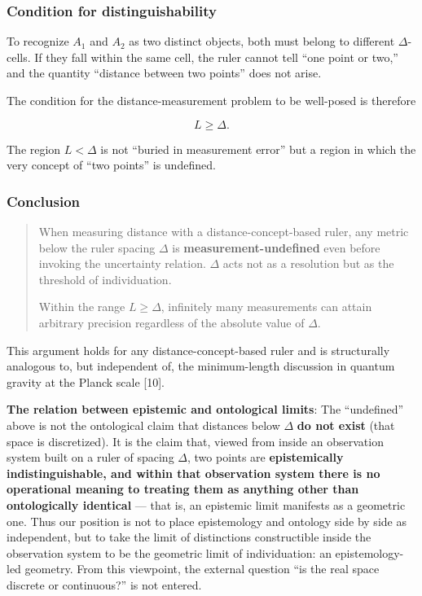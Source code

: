 \documentclass[
]{article}
\begin{document}
\subsubsection{Condition for
distinguishability}\label{condition-for-distinguishability}

To recognize \(A_1\) and \(A_2\) as two distinct objects, both must
belong to different \(\Delta\)-cells. If they fall within the same cell,
the ruler cannot tell ``one point or two,'' and the quantity ``distance
between two points'' does not arise.

The condition for the distance-measurement problem to be well-posed is
therefore

\[L \geq \Delta.\]

The region \(L < \Delta\) is not ``buried in measurement error'' but a
region in which the very concept of ``two points'' is undefined.

\subsubsection{Conclusion}\label{conclusion}

\begin{quote}
When measuring distance with a distance-concept-based ruler, any metric
below the ruler spacing \(\Delta\) is \textbf{measurement-undefined}
even before invoking the uncertainty relation. \(\Delta\) acts not as a
resolution but as the threshold of individuation.

Within the range \(L \geq \Delta\), infinitely many measurements can
attain arbitrary precision regardless of the absolute value of
\(\Delta\).
\end{quote}

This argument holds for any distance-concept-based ruler and is
structurally analogous to, but independent of, the minimum-length
discussion in quantum gravity at the Planck scale {[}10{]}.

\textbf{The relation between epistemic and ontological limits}: The
``undefined'' above is not the ontological claim that distances below
\(\Delta\) \textbf{do not exist} (that space is discretized). It is the
claim that, viewed from inside an observation system built on a ruler of
spacing \(\Delta\), two points are \textbf{epistemically
indistinguishable, and within that observation system there is no
operational meaning to treating them as anything other than
ontologically identical} --- that is, an epistemic limit manifests as a
geometric one. Thus our position is not to place epistemology and
ontology side by side as independent, but to take the limit of
distinctions constructible inside the observation system to be the
geometric limit of individuation: an epistemology-led geometry. From
this viewpoint, the external question ``is the real space discrete or
continuous?'' is not entered.
\end{document}
